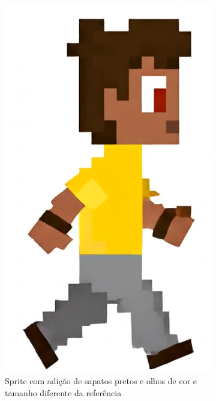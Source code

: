 \begin{figure}[htbp]
\begin{subfigure}{0.32\linewidth}
        \includegraphics[width=0.7\linewidth]{figs/geminiPro/chat3/sprite1.PNG}
        \caption{\small Sprite com adição de sapatos pretos e olhos de cor e tamanho diferente da referência}
        \label{fig:GeminiProAndarComparaSprite1}
    \end{subfigure}
    \begin{subfigure}{0.32\linewidth}
        \centering

\end{subfigure}
\end{figure}
